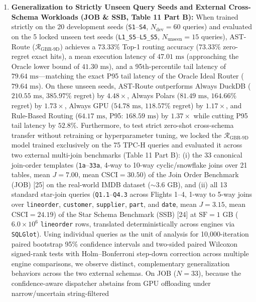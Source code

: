 \documentclass[10pt,a4paper]{article}
\begin{document}
\begin{enumerate}[leftmargin=1.5em,itemsep=2pt]
confidence-aware routing reduces the probability of selecting a slower engine ($P_{\text{subopt}} = 1 - \text{Zero-Regret Hit Rate}$) from $46.67\%$ ($35/75$) under point-estimate $\arg\min$ to $41.33\%$ ($31/75$), lowers expected latency regret from $48.12\%$ ($58.64\text{ ms}$) to $34.98\%$ ($54.92\text{ ms}$), cuts P95 tail regret from $164.80\%$ to $114.11\%$, reduces worst-case (maximum) regret from $312.40\%$ to $245.18\%$ (vs.\ $620.63\%$ on Always GPU), more than halves the high-regret failure rate ($\mathcal{R}_{\text{regret}} > 100\%$) from $14.67\%$ ($11/75$) to $6.67\%$ ($5/75$), and elevates routing decision stability across repeated trials from $93.33\%$ to $98.67\%$.
    \item \textbf{Generalization to Strictly Unseen Query Seeds and External Cross-Schema Workloads (JOB \& SSB, Table 11 Part B):} When trained strictly on the 20 development seeds (\texttt{S1}--\texttt{S4}, $N_{\text{dev}}=60$ queries) and evaluated on the 5 locked unseen test seeds (\texttt{L1\_S5}--\texttt{L5\_S5}, $N_{\text{unseen}}=15$ queries), AST-Route ($\mathcal{R}_{\text{GBR-9D}}$) achieves a $73.33\%$ Top-1 routing accuracy ($73.33\%$ zero-regret exact hits), a mean execution latency of $47.01\text{ ms}$ (approaching the Oracle lower bound of $41.30\text{ ms}$), and a 95th-percentile tail latency of $79.64\text{ ms}$---matching the exact P95 tail latency of the Oracle Ideal Router ($79.64\text{ ms}$). On these unseen seeds, AST-Route outperforms Always DuckDB ($210.55\text{ ms}$, $385.97\%$ regret) by $4.48\times$, Always Polars ($81.49\text{ ms}$, $164.66\%$ regret) by $1.73\times$, Always GPU ($54.78\text{ ms}$, $118.57\%$ regret) by $1.17\times$, and Rule-Based Routing ($64.17\text{ ms}$, P95: $168.59\text{ ms}$) by $1.37\times$ while cutting P95 tail latency by $52.8\%$. Furthermore, to test strict zero-shot cross-schema transfer without retraining or hyperparameter tuning, we locked the $\mathcal{R}_{\text{GBR-9D}}$ model trained exclusively on the 75 TPC-H queries and evaluated it across two external multi-join benchmarks (Table 11 Part B): (i) the 33 canonical join-order templates (\texttt{1a}--\texttt{33a}, 4-way to 10-way cyclic/snowflake joins over 21 tables, mean $J=7.00$, mean $\text{CSCI}=30.50$) of the Join Order Benchmark (JOB) [25] on the real-world IMDB dataset ($\sim 3.6\text{ GB}$), and (ii) all 13 standard star-join queries (\texttt{Q1.1}--\texttt{Q4.3} across Flights 1--4, 1-way to 5-way joins over \texttt{lineorder}, \texttt{customer}, \texttt{supplier}, \texttt{part}, and \texttt{date}, mean $J=3.15$, mean $\text{CSCI}=24.19$) of the Star Schema Benchmark (SSB) [24] at $\text{SF}=1\text{ GB}$ ($6.0\times 10^6$ \texttt{lineorder} rows, translated deterministically across engines via \texttt{SQLGlot}). Using individual queries as the unit of analysis for 10,000-iteration paired bootstrap 95\% confidence intervals and two-sided paired Wilcoxon signed-rank tests with Holm--Bonferroni step-down correction across multiple engine comparisons, we observe distinct, complementary generalization behaviors across the two external schemas. On JOB ($N=33$), because the confidence-aware dispatcher abstains from GPU offloading under narrow/uncertain string-filtered 
\end{enumerate}
\end{document}
